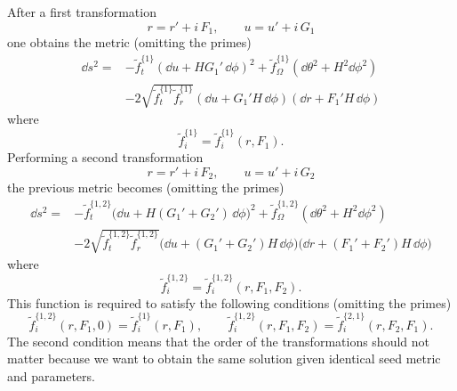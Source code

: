 After a first transformation
\begin{equation}
	r = r' + i\, F_1, \qquad
	u = u' + i\, G_1
\end{equation} 
one obtains the metric (omitting the primes)
\begin{equation}
	\begin{aligned}
		\dd s^2 = &- \tilde f^{\{1\}}_t (\dd u + H G_1'\, \dd\phi)^2
			+ \tilde f^{\{1\}}_\Omega (\dd\theta^2 + H^2 \dd\phi^2) \\
			&- 2 \sqrt{\tilde f^{\{1\}}_t \tilde f^{\{1\}}_r} (\dd u + G_1' H\, \dd\phi) (\dd r + F_1' H\, \dd\phi)
	\end{aligned}
\end{equation} 
where
\begin{equation}
	\tilde f^{\{1\}}_i = \tilde f^{\{1\}}_i(r, F_1).
\end{equation} 
Performing a second transformation
\begin{equation}
	r = r' + i\, F_2, \qquad
	u = u' + i\, G_2
\end{equation} 
the previous metric becomes (omitting the primes)
\begin{equation}
	\label{topdown:eq:metric-two-transf}
	\begin{aligned}
		\dd s^2 = &- \tilde f^{\{1,2\}}_t \big( \dd u + H (G_1' + G_2')\, \dd\phi \big)^2
			+ \tilde f^{\{1,2\}}_\Omega (\dd\theta^2 + H^2 \dd\phi^2) \\
			&- 2 \sqrt{\tilde f^{\{1,2\}}_t \tilde f^{\{1,2\}}_r} \big( \dd u + (G_1' + G_2') H\, \dd\phi \big) \big( \dd r + (F_1' + F_2') H\, \dd\phi \big)
	\end{aligned}
\end{equation} 
where
\begin{equation}
	\tilde f^{\{1,2\}}_i = \tilde f^{\{1,2\}}_i(r, F_1, F_2).
\end{equation}
This function is required to satisfy the following conditions (omitting the primes)
\begin{equation}
	\tilde f^{\{1,2\}}_i(r, F_1, 0) = \tilde f^{\{1\}}_i(r, F_1), \qquad
	\tilde f^{\{1,2\}}_i(r, F_1, F_2) = \tilde f^{\{2,1\}}_i(r, F_2, F_1).
\end{equation} 
The second condition means that the order of the transformations should not matter because we want to obtain the same solution given identical seed metric and parameters.

